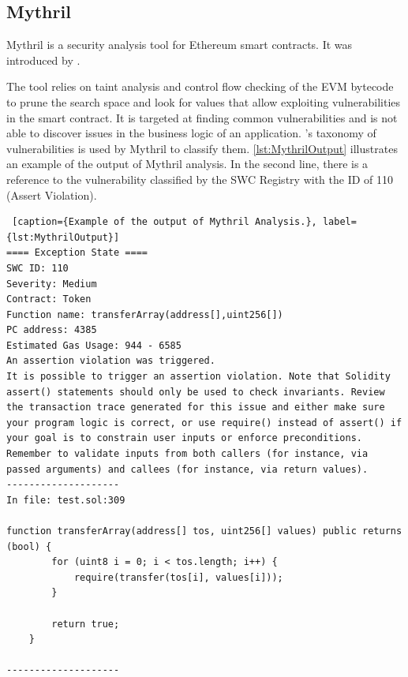 \subsection{Mythril}
\label{sec:WithoutSpecification:Mythril}
Mythril is a security analysis tool for Ethereum smart contracts. It was introduced by \citet{Mythril}.

The tool  relies on taint analysis and control flow checking of the EVM bytecode to
prune the search space and look for values that allow exploiting
vulnerabilities in the smart contract.
It is targeted at finding common vulnerabilities 
and is not able to discover issues in the business logic of an application. \citet{SWCRegistry}'s taxonomy of vulnerabilities is used by Mythril to classify them. 
\autoref{lst:MythrilOutput} illustrates an example of the output of Mythril analysis. 
In the second line, there is a reference to the vulnerability classified by the SWC Registry with the ID of 110 (Assert Violation).

\begin{lstlisting} [caption={Example of the output of Mythril Analysis.}, label={lst:MythrilOutput}]
==== Exception State ====
SWC ID: 110
Severity: Medium
Contract: Token
Function name: transferArray(address[],uint256[])
PC address: 4385
Estimated Gas Usage: 944 - 6585
An assertion violation was triggered.
It is possible to trigger an assertion violation. Note that Solidity assert() statements should only be used to check invariants. Review the transaction trace generated for this issue and either make sure your program logic is correct, or use require() instead of assert() if your goal is to constrain user inputs or enforce preconditions. Remember to validate inputs from both callers (for instance, via passed arguments) and callees (for instance, via return values).
--------------------
In file: test.sol:309

function transferArray(address[] tos, uint256[] values) public returns (bool) {
        for (uint8 i = 0; i < tos.length; i++) {
            require(transfer(tos[i], values[i]));
        }

        return true;
    }

--------------------

\end{lstlisting}